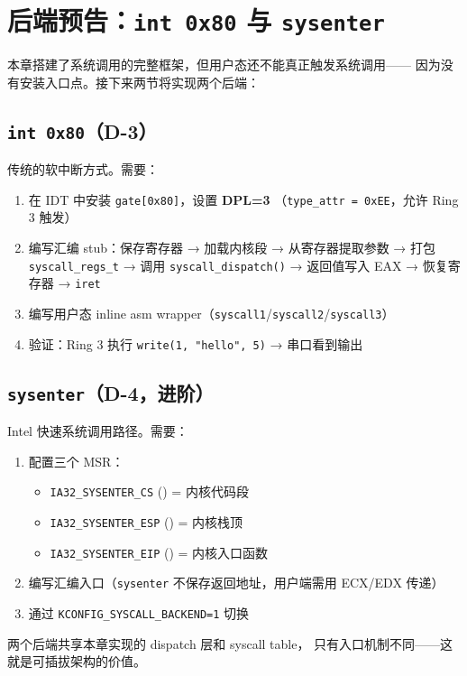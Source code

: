 \section{后端预告：\texttt{int 0x80} 与 \texttt{sysenter}}
\label{sec:syscall-backend-preview}

本章搭建了系统调用的完整框架，但用户态还不能真正触发系统调用——
因为没有安装入口点。接下来两节将实现两个后端：

\subsection{\texttt{int 0x80}（D-3）}

传统的软中断方式。需要：

\begin{enumerate}
  \item 在 IDT 中安装 \texttt{gate[0x80]}，设置 \textbf{DPL=3}
    （\texttt{type\_attr = 0xEE}，允许 Ring 3 触发）
  \item 编写汇编 stub：保存寄存器 → 加载内核段 → 从寄存器提取参数 →
    打包 \texttt{syscall\_regs\_t} → 调用 \texttt{syscall\_dispatch()} →
    返回值写入 EAX → 恢复寄存器 → \texttt{iret}
  \item 编写用户态 inline asm wrapper（\texttt{syscall1}/\texttt{syscall2}/\texttt{syscall3}）
  \item 验证：Ring 3 执行 \texttt{write(1, "hello", 5)} → 串口看到输出
\end{enumerate}

\subsection{\texttt{sysenter}（D-4，进阶）}

Intel 快速系统调用路径。需要：

\begin{enumerate}
  \item 配置三个 MSR：
    \begin{itemize}
      \item \texttt{IA32\_SYSENTER\_CS} () = 内核代码段
      \item \texttt{IA32\_SYSENTER\_ESP} () = 内核栈顶
      \item \texttt{IA32\_SYSENTER\_EIP} () = 内核入口函数
    \end{itemize}
  \item 编写汇编入口（\texttt{sysenter} 不保存返回地址，用户端需用 ECX/EDX 传递）
  \item 通过 \texttt{KCONFIG\_SYSCALL\_BACKEND=1} 切换
\end{enumerate}

两个后端共享本章实现的 dispatch 层和 syscall table，
只有入口机制不同——这就是可插拔架构的价值。
